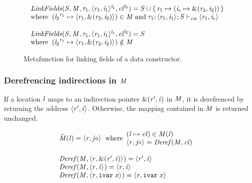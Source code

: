 {
\begin{figure}[h!]
\[
\begin{array}{lcl}
  \mathit{LinkFields}(\mathit{S},\mathit{M},\mathit{\tau}_1,\langle \mathit{r}_1, \mathit{i}_1 \rangle ^{\mathit{l}_1}, \mathit{cl}^{\mathit{l}_2}) = \mathit{S} \cup \{ \, \mathit{r}_1 \mapsto (\mathit{i}_e \mapsto \text{\&}(\mathit{r}_2,\mathit{i}_2)) \,\} \\  
  \text{where} \;\; ({\mathit{l}_2}^{\mathit{r}_1} \mapsto \langle \mathit{r}_1, \text{\&}(\mathit{r}_2,\mathit{i}_2) \rangle ^{}) \in \mathit{M}
  \; \text{and} \; \mathit{\tau}_1;\langle \mathit{r}_1, \mathit{i}_1 \rangle ^{};\mathit{S} \vdash_{\textit{ew}} \langle \mathit{r}_1, \mathit{i}_{e} \rangle ^{}\\\\
  \mathit{LinkFields}(\mathit{S},\mathit{M},\mathit{\tau}_1,\langle \mathit{r}_1, \mathit{i}_1 \rangle ^{\mathit{l}_1}, \mathit{cl}^{\mathit{l}_2}) = \mathit{S} \\  
  \text{where} \;\; ({\mathit{l}_2}^{\mathit{r}_1} \mapsto \langle \mathit{r}_1, \text{\&}(\mathit{r}_2,\mathit{i}_2) \rangle ^{}) \notin \mathit{M}
\end{array}
\]
\caption{Metafunction for linking fields of a data constructor.}
\label{fig:appendix-linking-fields}
\end{figure}
}


\subsubsection{Derefrencing indirections in $\mathit{M}$}
\label{subsec:maplookup}

If a location $\mathit{l}$ maps to an indirection pointer $\text{\&}(\mathit{r}',\mathit{i})$ in $\mathit{M}$,
it is derefrenced by returning the address $\langle \mathit{r}', \mathit{i} \rangle ^{}$.
%
Otherwise, the mapping contained in $\mathit{M}$ is returned unchanged.


{
\begin{figure}[h!]
\[
\begin{array}{l}
\hat{\mathit{M}}(\mathit{l}) = \langle \mathit{r}, \mathit{j}\diamond \rangle ^{} \;\; \text{where}
\begin{array}{l}
(\mathit{l} \mapsto \mathit{cl}) \in \mathit{M}(\mathit{l}) \\
\langle \mathit{r}, \mathit{j}\diamond \rangle ^{} = \mathit{Deref}(\mathit{M}, \mathit{cl})
\end{array} \\\\
\mathit{Deref}(\mathit{M},\langle \mathit{r}, \text{\&}(\mathit{r}',\mathit{i}) \rangle ^{}) = \langle \mathit{r}', \mathit{i} \rangle ^{} \\
\mathit{Deref}(\mathit{M},\langle \mathit{r}, \mathit{i} \rangle ^{}) = \langle \mathit{r}, \mathit{i} \rangle ^{} \\
\mathit{Deref}(\mathit{M},\langle \mathit{r}, \texttt{ivar}\; x \rangle ^{}) = \langle \mathit{r}, \texttt{ivar}\; x \rangle ^{}
\end{array}
\]
\caption{}
\label{fig:maplookup}
\end{figure}
}

